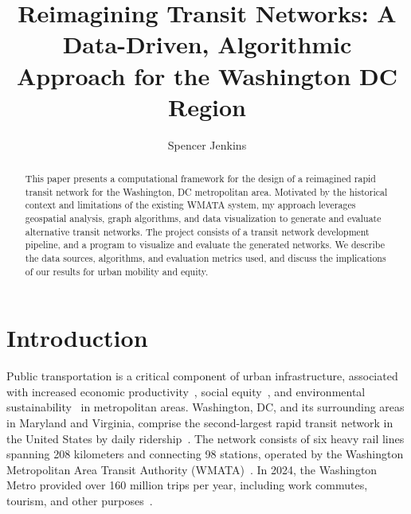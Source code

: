 \documentclass[manuscript]{acmart}
\begin{document}
\title{Reimagining Transit Networks: A Data-Driven, Algorithmic Approach for the Washington DC Region}

\author{Spencer Jenkins}


\renewcommand{\shortauthors}{Trovato et al.}

\begin{abstract}
This paper presents a computational framework for the design of a reimagined rapid transit network for the Washington, DC metropolitan area. Motivated by the historical context and limitations of the existing WMATA system, my approach leverages geospatial analysis, graph algorithms, and data visualization to generate and evaluate alternative transit networks. The project consists of a transit network development pipeline, and a program to visualize and evaluate the generated networks. We describe the data sources, algorithms, and evaluation metrics used, and discuss the implications of our results for urban mobility and equity.
\end{abstract}

\maketitle

\section{Introduction}

Public transportation is a critical component of urban infrastructure, associated with increased economic productivity~\cite{lit:prod}, social equity~\cite{lit:equity}, and environmental sustainability~\cite{lit:env} in metropolitan areas. Washington, DC, and its surrounding areas in Maryland and Virginia, comprise the second-largest rapid transit network in the United States by daily ridership~\cite{lit:wmata_stats}. The network consists of six heavy rail lines spanning 208 kilometers and connecting 98 stations, operated by the Washington Metropolitan Area Transit Authority (WMATA)~\cite{lit:wmata_stats}. In 2024, the Washington Metro provided over 160 million trips per year, including work commutes, tourism, and other purposes~\cite{lit:wmata_stats}.
\end{document}
